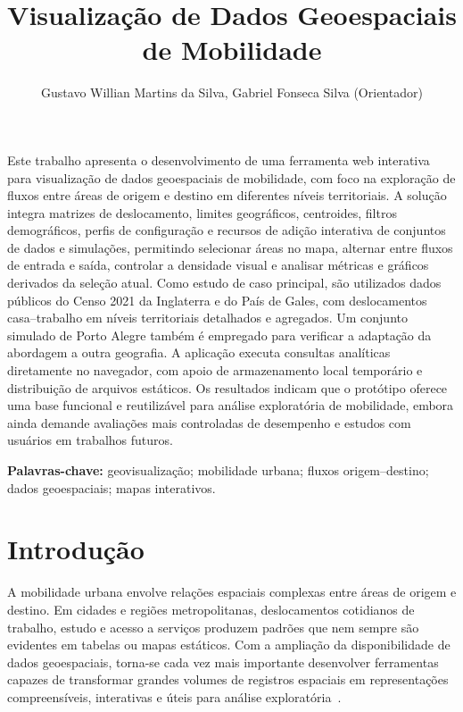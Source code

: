 \documentclass[12pt]{article}
\title{Visualização de Dados Geoespaciais de Mobilidade}
\author{Gustavo Willian Martins da Silva\inst{1}, Gabriel Fonseca Silva (Orientador)\inst{1}}
\begin{document}
 

\maketitle

\begin{resumo}
Este trabalho apresenta o desenvolvimento de uma ferramenta web interativa para visualização de dados geoespaciais de mobilidade, com foco na exploração de fluxos entre áreas de origem e destino em diferentes níveis territoriais. A solução integra matrizes de deslocamento, limites geográficos, centroides, filtros demográficos, perfis de configuração e recursos de adição interativa de conjuntos de dados e simulações, permitindo selecionar áreas no mapa, alternar entre fluxos de entrada e saída, controlar a densidade visual e analisar métricas e gráficos derivados da seleção atual. Como estudo de caso principal, são utilizados dados públicos do Censo 2021 da Inglaterra e do País de Gales, com deslocamentos casa--trabalho em níveis territoriais detalhados e agregados. Um conjunto simulado de Porto Alegre também é empregado para verificar a adaptação da abordagem a outra geografia. A aplicação executa consultas analíticas diretamente no navegador, com apoio de armazenamento local temporário e distribuição de arquivos estáticos. Os resultados indicam que o protótipo oferece uma base funcional e reutilizável para análise exploratória de mobilidade, embora ainda demande avaliações mais controladas de desempenho e estudos com usuários em trabalhos futuros.


\end{resumo}


\textbf{Palavras-chave:} geovisualização; mobilidade urbana; fluxos origem–destino; dados geoespaciais; mapas interativos.



\section{Introdução}

A mobilidade urbana envolve relações espaciais complexas entre áreas de origem e destino. Em cidades e regiões metropolitanas, deslocamentos cotidianos de trabalho, estudo e acesso a serviços produzem padrões que nem sempre são evidentes em tabelas ou mapas estáticos. Com a ampliação da disponibilidade de dados geoespaciais, torna-se cada vez mais importante desenvolver ferramentas capazes de transformar grandes volumes de registros espaciais em representações compreensíveis, interativas e úteis para análise exploratória~\cite{s19020332,Praharaj}.
\end{document}
